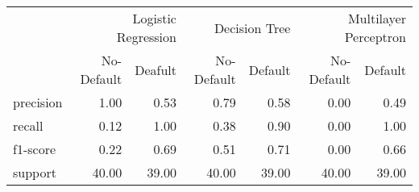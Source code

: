 \begin{table}
\thcenter
\begin{tabular}{lrrrrrr}
 & \multicolumn{2}{r}{Logistic Regression} & \multicolumn{2}{r}{Decision Tree  } & \multicolumn{2}{r}{Multilayer Perceptron} \\
 & No-Default & Deafult & No-Default & Default & No-Default & Default \\
precision & 1.00 & 0.53 & 0.79 & 0.58 & 0.00 & 0.49 \\
recall & 0.12 & 1.00 & 0.38 & 0.90 & 0.00 & 1.00 \\
f1-score & 0.22 & 0.69 & 0.51 & 0.71 & 0.00 & 0.66 \\
support & 40.00 & 39.00 & 40.00 & 39.00 & 40.00 & 39.00 \\
\end{tabular}
\end{table}
